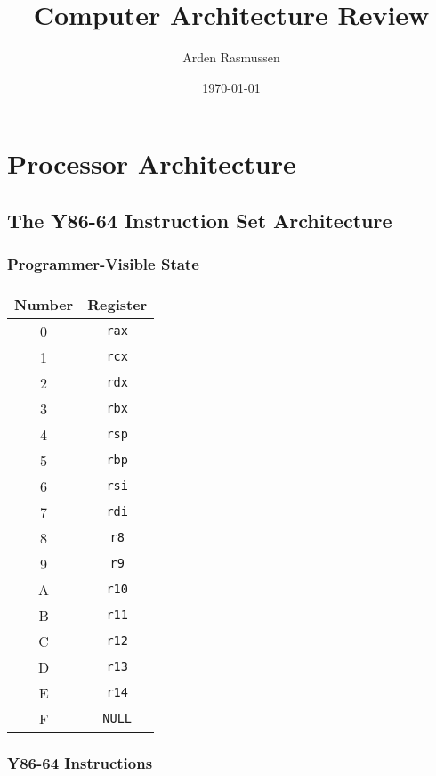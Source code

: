 \documentclass[10pt]{armath}
\title{Computer Architecture Review}
\author{Arden Rasmussen}
\date{\today}
\newcommand{\s}[1]{\texttt{#1}}
\begin{document}
\maketitle

\section{Processor Architecture}%
\label{sec:processor_architecture}

\subsection{The Y86-64 Instruction Set Architecture}%
\label{sub:the_y86_64_instruction_set_architecture}

\subsubsection{Programmer-Visible State}%
\label{ssub:programmer_visible_state}

\begin{center}
  \begin{tabular}{c c}
    Number & Register\\
    \hline
    0 & \s{rax}\\
    1 & \s{rcx}\\
    2 & \s{rdx}\\
    3 & \s{rbx}\\
    4 & \s{rsp}\\
    5 & \s{rbp}\\
    6 & \s{rsi}\\
    7 & \s{rdi}\\
    8 & \s{r8}\\
    9 & \s{r9}\\
    A & \s{r10}\\
    B & \s{r11}\\
    C & \s{r12}\\
    D & \s{r13}\\
    E & \s{r14}\\
    F & \s{NULL}\\\hline
  \end{tabular}
\end{center}

\subsubsection{Y86-64 Instructions}%
\label{ssub:y86_64_instructions}
\end{document}
